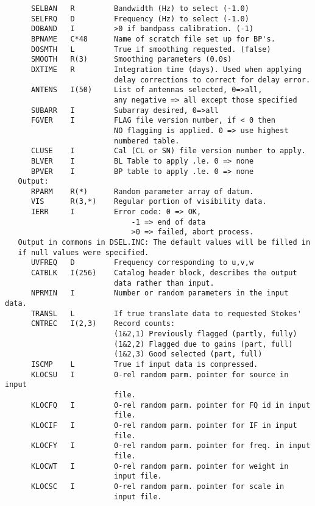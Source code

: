 \begin{verbatim}
      SELBAN   R         Bandwidth (Hz) to select (-1.0)
      SELFRQ   D         Frequency (Hz) to select (-1.0)
      DOBAND   I         >0 if bandpass calibration. (-1)
      BPNAME   C*48      Name of scratch file set up for BP's.
      DOSMTH   L         True if smoothing requested. (false)
      SMOOTH   R(3)      Smoothing parameters (0.0s)
      DXTIME   R         Integration time (days). Used when applying
                         delay corrections to correct for delay error.
      ANTENS   I(50)     List of antennas selected, 0=>all,
                         any negative => all except those specified
      SUBARR   I         Subarray desired, 0=>all
      FGVER    I         FLAG file version number, if < 0 then
                         NO flagging is applied. 0 => use highest
                         numbered table.
      CLUSE    I         Cal (CL or SN) file version number to apply.
      BLVER    I         BL Table to apply .le. 0 => none
      BPVER    I         BP table to apply .le. 0 => none
   Output:
      RPARM    R(*)      Random parameter array of datum.
      VIS      R(3,*)    Regular portion of visibility data.
      IERR     I         Error code: 0 => OK,
                             -1 => end of data
                             >0 => failed, abort process.
   Output in commons in DSEL.INC: The default values will be filled in
   if null values were specified.
      UVFREQ   D         Frequency corresponding to u,v,w
      CATBLK   I(256)    Catalog header block, describes the output
                         data rather than input.
      NPRMIN   I         Number or random parameters in the input data.
      TRANSL   L         If true translate data to requested Stokes'
      CNTREC   I(2,3)    Record counts:
                         (1&2,1) Previously flagged (partly, fully)
                         (1&2,2) Flagged due to gains (part, full)
                         (1&2,3) Good selected (part, full)
      ISCMP    L         True if input data is compressed.
      KLOCSU   I         0-rel random parm. pointer for source in input
                         file.
      KLOCFQ   I         0-rel random parm. pointer for FQ id in input
                         file.
      KLOCIF   I         0-rel random parm. pointer for IF in input
                         file.
      KLOCFY   I         0-rel random parm. pointer for freq. in input
                         file.
      KLOCWT   I         0-rel random parm. pointer for weight in
                         input file.
      KLOCSC   I         0-rel random parm. pointer for scale in
                         input file.

\end{verbatim}
